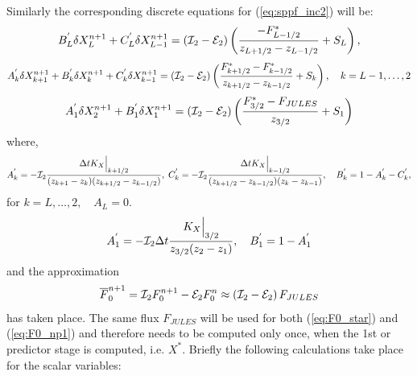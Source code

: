 \documentclass{UMDP_article}
\begin{document}
Similarly the corresponding discrete equations for
(\ref{eq:sppf_inc2}) will be:
\begin{equation}
  B_{L}^{'}\delta X_{L}^{n+1}+C_{L}^{'}\delta X_{L-1}^{n+1}=\left({\cal I}_{2}-{\cal E}_{2}\right)\left(\frac{-F_{L-1/2}^{*}}{z_{L+1/2}-z_{L-1/2}}+S_{L}\right),\label{eq:dXtop_np1}
\end{equation}
\begin{equation}
  A_{k}^{'}\delta X_{k+1}^{n+1}+B_{k}^{'}\delta X_{k}^{n+1}+C_{k}^{'}\delta X_{k-1}^{n+1}=\left({\cal I}_{2}-{\cal E}_{2}\right)\left(\frac{F_{k+1/2}^{*}-F_{k-1/2}^{*}}{z_{k+1/2}-z_{k-1/2}}+S_{k}\right),\quad k=L-1,\ldots,2\label{eq:dXk_np1}
\end{equation}
\begin{equation}
  A_{1}^{'}\delta X_{2}^{n+1}+B_{1}^{'}\delta X_{1}^{n+1}=\left({\cal I}_{2}-{\cal E}_{2}\right)\left(\frac{F_{3/2}^{*}-F_{JULES}}{z_{3/2}}+S_{1}\right)\label{eq:dX1_np1}
\end{equation}
where,
\begin{equation*}
  A_{k}^{'}=-{\cal I}_{2}\frac{\Delta tK_{X}\Big|_{k+1/2}}{(z_{k+1}-z_{k})(z_{k+1/2}-z_{k-1/2})},\; C_{k}^{'}=-{\cal I}_{2}\frac{\Delta tK_{X}\Big|_{k-1/2}}{(z_{k+1/2}-z_{k-1/2})(z_{k}-z_{k-1})},\quad B_{k}^{'}=1-A_{k}^{'}-C_{k}^{'},
\end{equation*}
for $k=L,\ldots,2,\quad A_{L}=0$.
\begin{equation*}
  A_{1}^{'}=-{\cal I}_{2}\Delta t\frac{K_{X}\Big|_{3/2}}{z_{3/2}(z_{2}-z_{1})},\quad B_{1}^{'}=1-A_{1}^{'}
\end{equation*}
and the approximation
\begin{equation}
  \overline{F}_{0}^{n+1}={\cal I}_{2}F_{0}^{n+1}-{\cal E}_{2}F_{0}^{n}\approx\left({\cal I}_{2}-{\cal E}_{2}\right)F_{JULES}\label{eq:F0_np1}
\end{equation}
has taken place. The same flux $F_{JULES}$ will be used for both
(\ref{eq:F0_star}) and (\ref{eq:F0_np1}) and therefore needs to be
computed only once, when the 1st or predictor stage is computed,
i.e. $X^{*}$. Briefly the following calculations take place for the
scalar variables:
\end{document}
